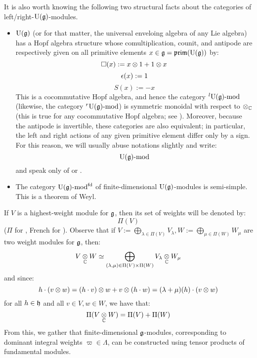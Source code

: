         It is also worth knowing the following two structural facts about the categories of left/right-$\mathrm{U}(\mathfrak{g})$-modules.
        \begin{itemize}
            \item $\mathrm{U}(\mathfrak{g})$ (or for that matter, the universal enveloing algebra of any Lie algebra) has a Hopf algebra structure whose comultiplication, counit, and antipode are respectively given on all primitive elements $x \in \mathfrak{g} = \mathfrak{prim}(\mathrm{U}(\mathfrak{g}))$ by:
                $$\Box(x) := x \tensor 1 + 1 \tensor x$$
                $$\epsilon(x) := 1$$
                $$S(x) := -x$$
            This is a cocommutative Hopf algebra, and hence the category ${}^l\mathrm{U}(\mathfrak{g})\text{-}\mathrm{mod}$ (likewise, the category ${}^r\mathrm{U}(\mathfrak{g})\text{-}\mathrm{mod}$) is symmetric monoidal with respect to $\tensor_{\bbC}$ (this is true for any cocommutative Hopf algebra; see \cite[Proposition III.5.1]{kassel_quantum_groups}). Moreover, because the antipode is invertible, these categories are also equivalent; in particular, the left and right actions of any given primitive element differ only by a sign. For this reason, we will usually abuse notations slightly and write:
                $$\mathrm{U}(\mathfrak{g})\text{-}\mathrm{mod}$$
            and speak only of  or .
            \item The category $\mathrm{U}(\mathfrak{g})\text{-}\mathrm{mod}^{\mathrm{fd}}$ of finite-dimensional $\mathrm{U}(\mathfrak{g})$-modules is semi-simple. This is a theorem of Weyl.
        \end{itemize} 

        If $V$ is a highest-weight module for $\mathfrak{g}$, then its set of weights will be denoted by:
            $$\Pi(V)$$
        ($\Pi$ for , French for ). Observe that if $V := \bigoplus_{\lambda \in \Pi(V)} V_{\lambda}, W := \bigoplus_{\mu \in \Pi(W)} W_{\mu}$ are two weight modules for $\mathfrak{g}$, then:
            $$V \tensor_{\bbC} W \cong  \bigoplus_{(\lambda, \mu) \in \Pi(V) \x \Pi(W)} V_{\lambda} \tensor_{\bbC} W_{\mu}$$
        and since:
            $$h \cdot (v \tensor w) = (h \cdot v) \tensor w + v \tensor (h \cdot w) = (\lambda + \mu)(h) \cdot (v \tensor w)$$
        for all $h \in \mathfrak{h}$ and all $v \in V, w \in W$, we have that:
            $$\Pi(V \tensor_{\bbC} W) = \Pi(V) + \Pi(W)$$
        From this, we gather that finite-dimensional $\mathfrak{g}$-modules, corresponding to dominant integral weights $\varpi \in \Lambda$, can be constructed using tensor products of fundamental modules.  


